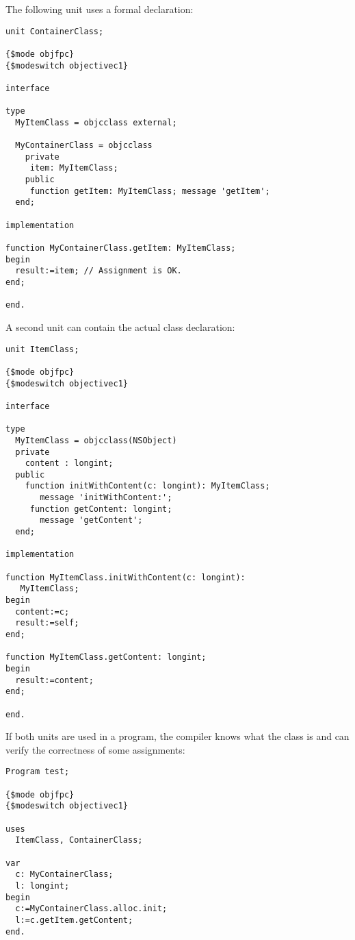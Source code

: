 The following unit uses a formal declaration:
\begin{verbatim}
unit ContainerClass;

{$mode objfpc}
{$modeswitch objectivec1}

interface

type
  MyItemClass = objcclass external;

  MyContainerClass = objcclass
    private
     item: MyItemClass;
    public
     function getItem: MyItemClass; message 'getItem';
  end;

implementation

function MyContainerClass.getItem: MyItemClass;
begin
  result:=item; // Assignment is OK.
end;

end.
\end{verbatim}
A second unit can contain the actual class declaration:
\begin{verbatim}
unit ItemClass;

{$mode objfpc}
{$modeswitch objectivec1}

interface

type
  MyItemClass = objcclass(NSObject)
  private
    content : longint;
  public
    function initWithContent(c: longint): MyItemClass;
       message 'initWithContent:';
     function getContent: longint;
       message 'getContent';
  end;

implementation

function MyItemClass.initWithContent(c: longint):
   MyItemClass;
begin
  content:=c;
  result:=self;
end;

function MyItemClass.getContent: longint;
begin
  result:=content;
end;

end.
\end{verbatim}
If both units are used in a program, the compiler knows what the class is
and can verify the correctness of some assignments:
\begin{verbatim}
Program test;

{$mode objfpc}
{$modeswitch objectivec1}

uses
  ItemClass, ContainerClass;

var
  c: MyContainerClass;
  l: longint;
begin
  c:=MyContainerClass.alloc.init;
  l:=c.getItem.getContent;
end.
\end{verbatim}

